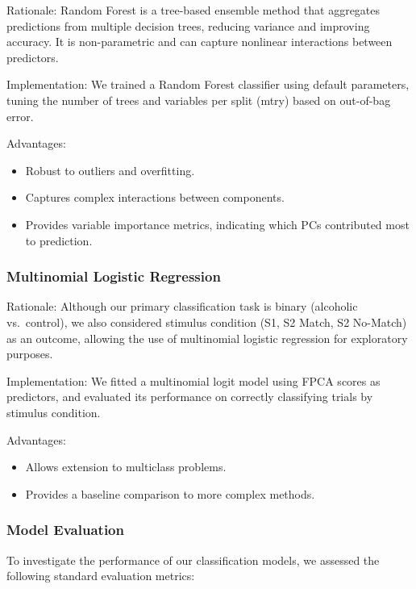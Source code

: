 \documentclass{article}
\begin{document}
Rationale: Random Forest is a tree-based ensemble method that aggregates
predictions from multiple decision trees, reducing variance and
improving accuracy. It is non-parametric and can capture nonlinear
interactions between predictors.

Implementation: We trained a Random Forest classifier using default
parameters, tuning the number of trees and variables per split (mtry)
based on out-of-bag error.

Advantages:

\begin{itemize}
\item
  Robust to outliers and overfitting.
\item
  Captures complex interactions between components.
\item
  Provides variable importance metrics, indicating which PCs contributed
  most to prediction.
\end{itemize}

\subsubsection{Multinomial Logistic
Regression}\label{multinomial-logistic-regression}

Rationale: Although our primary classification task is binary (alcoholic
vs.~control), we also considered stimulus condition (S1, S2 Match, S2
No-Match) as an outcome, allowing the use of multinomial logistic
regression for exploratory purposes.

Implementation: We fitted a multinomial logit model using FPCA scores as
predictors, and evaluated its performance on correctly classifying
trials by stimulus condition.

Advantages:

\begin{itemize}
\item
  Allows extension to multiclass problems.
\item
  Provides a baseline comparison to more complex methods.
\end{itemize}

\subsubsection{Model Evaluation}\label{model-evaluation}

To investigate the performance of our classification models, we assessed
the following standard evaluation metrics:
\end{document}
